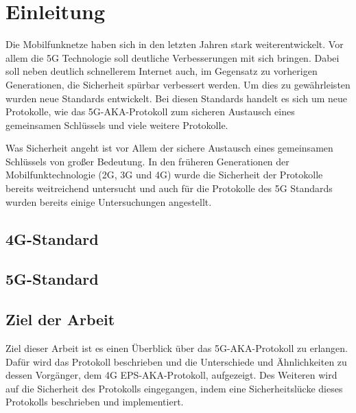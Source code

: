 \chapter{Einleitung}
\label{chap:1}

Die Mobilfunknetze haben sich in den letzten Jahren stark weiterentwickelt. %
Vor allem die 5G Technologie soll deutliche Verbesserungen mit sich bringen. 
Dabei soll neben deutlich schnellerem Internet auch, im Gegensatz zu vorherigen Generationen, die Sicherheit sp\"urbar verbessert werden.
Um dies zu gew\"ahrleisten wurden neue Standards entwickelt. 
Bei diesen Standards handelt es sich um neue Protokolle, wie das 5G-AKA-Protokoll zum sicheren Austausch eines gemeinsamen Schl\"ussels und viele weitere Protokolle.

Was Sicherheit angeht ist vor Allem der sichere Austausch eines gemeinsamen Schl\"ussels von gro{\ss}er Bedeutung. 
In den fr\"uheren Generationen der Mobilfunktechnologie (2G, 3G und 4G) wurde die Sicherheit der Protokolle bereits weitreichend untersucht und auch f\"ur die Protokolle des 5G Standards wurden bereits einige Untersuchungen angestellt. %


\section{4G-Standard}


\section{5G-Standard}


\section{Ziel der Arbeit}
Ziel dieser Arbeit ist es einen \"Uberblick \"uber das 5G-AKA-Protokoll zu erlangen. Daf\"ur wird das Protokoll beschrieben und die Unterschiede und \"Ahnlichkeiten zu dessen Vorg\"anger, dem 4G EPS-AKA-Protokoll, aufgezeigt. Des Weiteren wird auf die Sicherheit des Protokolls eingegangen, indem eine Sicherheitsl\"ucke dieses Protokolls beschrieben und implementiert. %


